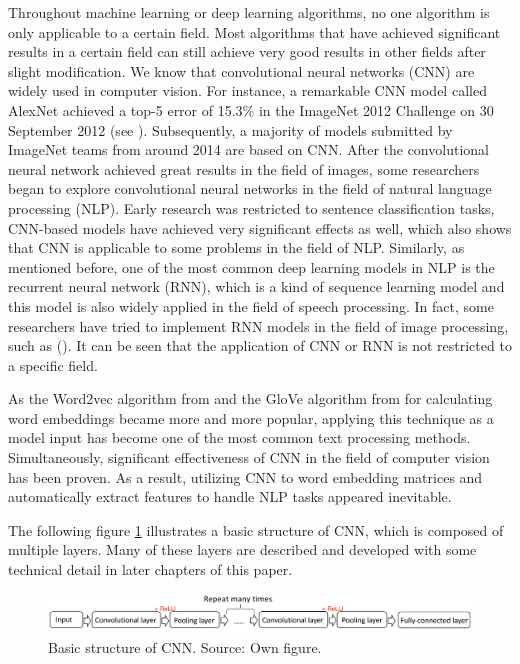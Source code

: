 \documentclass[]{krantz}
\begin{document}
Throughout machine learning or deep learning algorithms, no one algorithm is only applicable to a certain field. Most algorithms that have achieved significant results in a certain field can still achieve very good results in other fields after slight modification. We know that convolutional neural networks (CNN) are widely used in computer vision. For instance, a remarkable CNN model called AlexNet achieved a top-5 error of 15.3\% in the ImageNet 2012 Challenge on 30 September 2012 (see \citet{Krizhevsky2012ImageNetCW}). Subsequently, a majority of models submitted by ImageNet teams from around 2014 are based on CNN. After the convolutional neural network achieved great results in the field of images, some researchers began to explore convolutional neural networks in the field of natural language processing (NLP). Early research was restricted to sentence classification tasks, CNN-based models have achieved very significant effects as well, which also shows that CNN is applicable to some problems in the field of NLP. Similarly, as mentioned before, one of the most common deep learning models in NLP is the recurrent neural network (RNN), which is a kind of sequence learning model and this model is also widely applied in the field of speech processing. In fact, some researchers have tried to implement RNN models in the field of image processing, such as (\citet{Visin2015ReNetAR}). It can be seen that the application of CNN or RNN is not restricted to a specific field.

As the Word2vec algorithm from \citet{Mikolov.2013c} and the GloVe algorithm from \citet{Pennington.2014} for calculating word embeddings became more and more popular, applying this technique as a model input has become one of the most common text processing methods. Simultaneously, significant effectiveness of CNN in the field of computer vision has been proven. As a result, utilizing CNN to word embedding matrices and automatically extract features to handle NLP tasks appeared inevitable.

The following figure \ref{fig:figintro1} illustrates a basic structure of CNN, which is composed of multiple layers. Many of these layers are described and developed with some technical detail in later chapters of this paper.

\begin{figure}[h]

{\centering \includegraphics[width=1.05\linewidth]{figures/01-00-deep-learning-for-nlp/01_03_basic_structure} 

}

\caption{Basic structure of CNN. Source: Own figure.}\label{fig:figintro1}
\end{figure}
\end{document}
